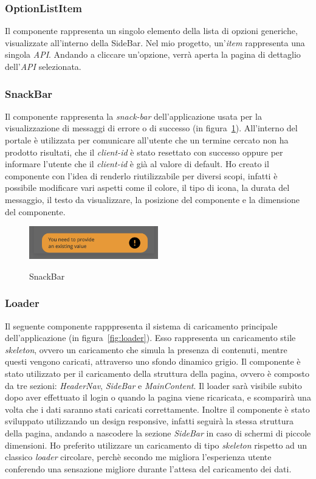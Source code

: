 \subsubsection{OptionListItem}\label{subsubsec:option-list-item}
Il componente rappresenta un singolo elemento della lista di opzioni generiche, visualizzate all'interno della SideBar. Nel mio progetto, un'\textit{item} rappresenta una singola \textit{API}.
Andando a cliccare un'opzione, verrà aperta la pagina di dettaglio dell'\textit{API} selezionata.

\subsubsection{SnackBar}\label{subsubsec:snack-bar}
Il componente rappresenta la \textit{snack-bar} dell'applicazione usata per la visualizzazione di messaggi di errore o di successo (in figura~\ref{fig:snack-bar}).
All'interno del portale è utilizzata per comunicare all'utente che un termine cercato non ha prodotto risultati, che il \textit{client-id} è stato resettato con successo
oppure per informare l'utente che il \textit{client-id} è già al valore di default.
Ho creato il componente con l'idea di renderlo riutilizzabile per diversi scopi, infatti è possibile modificare vari aspetti come il colore, il tipo di icona,
la durata del messaggio, il testo da visualizzare, la posizione del componente e la dimensione del componente.

\begin{figure}[ht]
  \centering
  \includegraphics[width=0.5\textwidth, alt={Snackbar di errore}]{images/frontend/SnackBar1.jpg}
  \caption{SnackBar}\label{fig:snack-bar}
\end{figure}

\subsubsection{Loader}\label{subsubsec:loader}
Il seguente componente rapppresenta il sistema di caricamento principale dell'applicazione (in figura~\ref{fig:loader}).
Esso rappresenta un caricamento stile \textit{skeleton}, ovvero un caricamento che simula la presenza di contenuti, mentre questi vengono caricati, attraverso 
uno sfondo dinamico grigio.
Il componente è stato utilizzato per il caricamento della struttura della pagina, ovvero è composto da tre sezioni: \textit{HeaderNav}, \textit{SideBar} e
\textit{MainContent}. Il loader sarà visibile subito dopo aver effettuato il login o quando la pagina viene ricaricata, e scomparirà una volta che i dati saranno stati caricati correttamente.
Inoltre il componente è stato sviluppato utilizzando un design responsive, infatti seguirà la stessa struttura della pagina, andando a nascodere la sezione 
\textit{SideBar} in caso di schermi di piccole dimensioni.
Ho preferito utilizzare un caricamento di tipo \textit{skeleton} rispetto ad un classico \textit{loader} circolare, perchè secondo me migliora l'esperienza utente 
conferendo una sensazione migliore durante l'attesa del caricamento dei dati.

